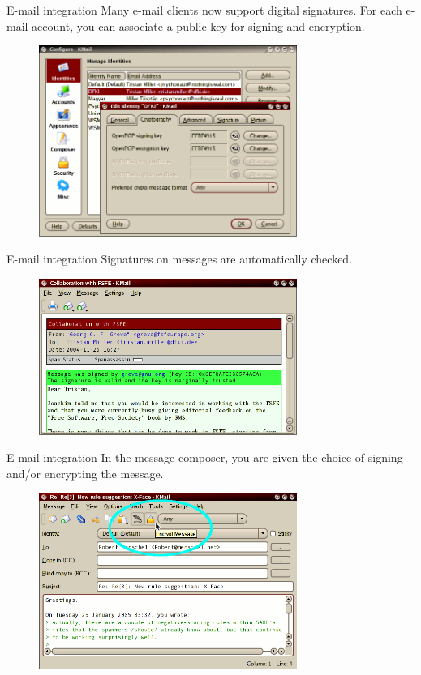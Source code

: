 \documentclass[%
mode=present,%
paper=screen%
]{powerdot}
\begin{document}
\begin{slide}{E-mail integration}
  Many e-mail clients now support digital signatures.  For each e-mail
  account, you can associate a public key for signing and encryption.
  \begin{figure}[H]
    \centering
    \includegraphics[width=0.75\textwidth]{kmail_conf}
    \label{fig:kmail_conf}
  \end{figure}
\end{slide}

\begin{slide}[toc=]{E-mail integration}
  Signatures on messages are automatically checked.
  \begin{figure}[H]
    \centering
    \includegraphics[width=0.75\textwidth]{kmail_recvd}
    \label{fig:kmail_recvd}
  \end{figure}
\end{slide}

\begin{slide}[toc=]{E-mail integration}
  In the message composer, you are given the choice of signing and/or
  encrypting the message.
  \begin{figure}[H]
    \centering
    \includegraphics[width=0.75\textwidth]{kmail_send}
    \label{fig:kmail_send}
  \end{figure}
\end{slide}
\end{document}

